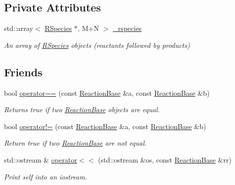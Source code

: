\subsection*{Private Attributes}
\begin{DoxyCompactItemize}
\item 
std\-::array$<$ \hyperlink{classchem_1_1RSpecies}{R\-Species} $\ast$, M+N $>$ \hyperlink{classchem_1_1Reaction_a42e73865e61bfb5b03a4639b571e5d72}{\-\_\-rspecies}
\begin{DoxyCompactList}\small\item\em An array of \hyperlink{classchem_1_1RSpecies}{R\-Species} objects (reactants followed by products) \end{DoxyCompactList}\end{DoxyCompactItemize}
\subsection*{Friends}
\begin{DoxyCompactItemize}
\item 
bool \hyperlink{classchem_1_1ReactionBase_a0285e054f9aa3055e21cefe65c74fd80}{operator==} (const \hyperlink{classchem_1_1ReactionBase}{Reaction\-Base} \&a, const \hyperlink{classchem_1_1ReactionBase}{Reaction\-Base} \&b)
\begin{DoxyCompactList}\small\item\em Returns true if two \hyperlink{classchem_1_1ReactionBase}{Reaction\-Base} objects are equal. \end{DoxyCompactList}\item 
bool \hyperlink{classchem_1_1ReactionBase_a65d0e9651baf3f48044d585e619ccd6f}{operator!=} (const \hyperlink{classchem_1_1ReactionBase}{Reaction\-Base} \&a, const \hyperlink{classchem_1_1ReactionBase}{Reaction\-Base} \&b)
\begin{DoxyCompactList}\small\item\em Return true if two \hyperlink{classchem_1_1ReactionBase}{Reaction\-Base} are not equal. \end{DoxyCompactList}\item 
std\-::ostream \& \hyperlink{classchem_1_1ReactionBase_aaa825ee7c911e4f932ce39b69960e08a}{operator$<$$<$} (std\-::ostream \&os, const \hyperlink{classchem_1_1ReactionBase}{Reaction\-Base} \&rr)
\begin{DoxyCompactList}\small\item\em Print self into an iostream. \end{DoxyCompactList}\end{DoxyCompactItemize}


